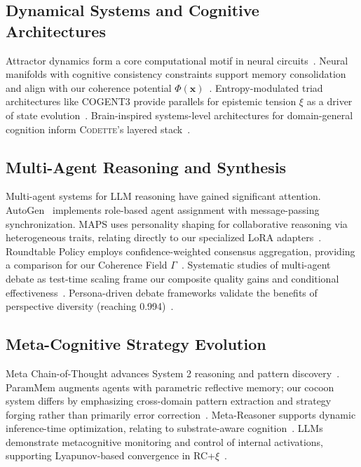 \documentclass[11pt,a4paper]{article}
\newcommand{\codette}{\textsc{Codette}}
\begin{document}
\subsection{Dynamical Systems and Cognitive Architectures}
Attractor dynamics form a core computational motif in neural circuits~\citep{fakhoury2025models}. Neural manifolds with cognitive consistency constraints support memory consolidation and align with our coherence potential $\Phi(\mathbf{x})$~\citep{nguyen2025neural}. Entropy-modulated triad architectures like COGENT3 provide parallels for epistemic tension $\xi$ as a driver of state evolution~\citep{salazar2025cogent3}. Brain-inspired systems-level architectures for domain-general cognition inform \codette{}'s layered stack~\citep{achterberg2023building}.

\subsection{Multi-Agent Reasoning and Synthesis}
Multi-agent systems for LLM reasoning have gained significant attention. AutoGen~\citep{wu2023autogen} implements role-based agent assignment with message-passing synchronization. MAPS uses personality shaping for collaborative reasoning via heterogeneous traits, relating directly to our specialized LoRA adapters~\citep{zhang2025maps}. Roundtable Policy employs confidence-weighted consensus aggregation, providing a comparison for our Coherence Field $\Gamma$~\citep{yao2025roundtable}. Systematic studies of multi-agent debate as test-time scaling frame our composite quality gains and conditional effectiveness~\citep{yang2025revisiting}. Persona-driven debate frameworks validate the benefits of perspective diversity (reaching 0.994)~\citep{hu2025debate}.

\subsection{Meta-Cognitive Strategy Evolution}
Meta Chain-of-Thought advances System 2 reasoning and pattern discovery~\citep{xiang2025meta}. ParamMem augments agents with parametric reflective memory; our cocoon system differs by emphasizing cross-domain pattern extraction and strategy forging rather than primarily error correction~\citep{yao2026parammem}. Meta-Reasoner supports dynamic inference-time optimization, relating to substrate-aware cognition~\citep{sui2025metareasoner}. LLMs demonstrate metacognitive monitoring and control of internal activations, supporting Lyapunov-based convergence in RC+$\xi$~\citep{ji2025metacognitive}.
\end{document}
